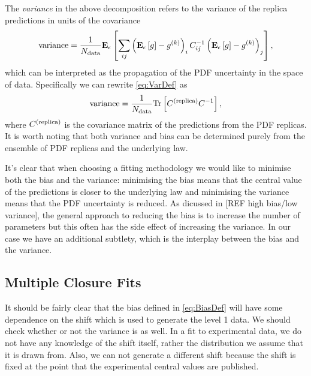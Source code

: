 The {\em variance} in the above decomposition refers to the variance of the
replica predictions in units of the covariance
\begin{equation}
    \label{eq:VarDef}
    {\rm variance} = \frac{1}{N_{\rm data}} \mathbf{E}_{\epsilon}\left[  \sum_{ij} \left( \mathbf{E}_{\epsilon}\left[ g \right] - g^{(k)}\right)_{i} C^{-1}_{ij} \left( \mathbf{E}_{\epsilon}\left[ g \right] - g^{(k)}\right)_{j} \right],
\end{equation}
which can be interpreted as the propagation of the PDF uncertainty in the space
of data. Specifically we can rewrite \eqref{eq:VarDef} as
\begin{equation}
    \label{eq:VarDefalternative}
    {\rm variance} = \frac{1}{N_{\rm data}} {\rm Tr} \left[ C^{(\rm replica)} C^{-1}_{} \right],
\end{equation}
where $C^{(\rm replica)}$ is the covariance matrix of the predictions
from the PDF replicas.
It is worth noting that both variance and bias can be determined
purely from the ensemble of PDF replicas and the underlying law.

It's clear that when choosing a fitting methodology we would like to minimise
both the bias and the variance: minimising the bias means that the central
value of the predictions is closer to the underlying law and minimising
the variance means that the PDF uncertainty is reduced. As dicussed in [REF
high bias/low variance], the general approach to reducing the bias is to
increase the number of parameters but this often has the side effect of
increasing the variance. In our case we have an additional subtlety, which is
the interplay between the bias and the variance.

\subsection{Multiple Closure Fits}

It should be fairly clear that the bias defined in \eqref{eq:BiasDef} will have
some dependence on the shift which is used to generate the level 1 data. We should
check whether or not the variance is as well. In a fit to experimental
data, we do not have any knowledge of the shift itself, rather the distribution
we assume that it is drawn from. Also, we can not generate a different shift
because the shift is fixed at the point that the experimental central values
are published.

